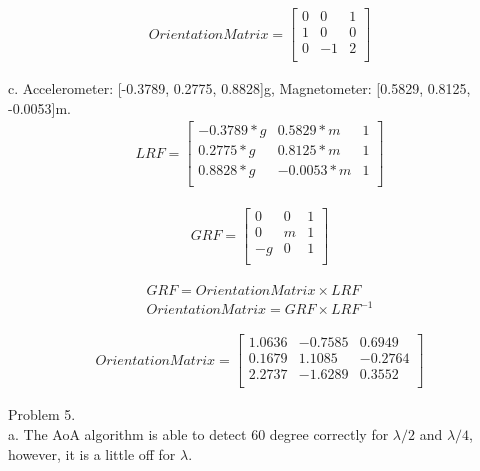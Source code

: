 \documentclass[a4paper]{article}
\begin{document}
\begin{align}
OrientationMatrix = 
\begin{bmatrix}
    0 & 0  & 1\\
   1 & 0 & 0\\
     0 & -1 & 2\\
\end{bmatrix}
\end{align}


c. Accelerometer: [-0.3789, 0.2775, 0.8828]g, Magnetometer: [0.5829, 0.8125, -0.0053]m.\\

\begin{align}
LRF = 
\begin{bmatrix}
   -0.3789*g & 0.5829*m & 1\\
      0.2775*g & 0.8125*m & 1\\
      0.8828*g & -0.0053*m & 1\\
\end{bmatrix}
\end{align}

\begin{align}
GRF = 
\begin{bmatrix}
    0 & 0  & 1\\
   0 & m & 1\\
    -g & 0 & 1\\
\end{bmatrix}
\end{align}

\begin{align}
GRF = Orientation Matrix \times LRF\\
Orientation Matrix = GRF \times LRF^{-1}
\end{align}

\begin{align}
OrientationMatrix = 
\begin{bmatrix}
    1.0636 &   -0.7585 &    0.6949\\
    0.1679 &    1.1085 &  -0.2764\\
    2.2737 &   -1.6289 &    0.3552\\
    \end{bmatrix}
\end{align}

\pagebreak
Problem 5. \\

a. The AoA algorithm is able to detect 60 degree correctly for $\lambda/2$ and $\lambda/4$, however, it is a little off for $\lambda$.
\end{document}

